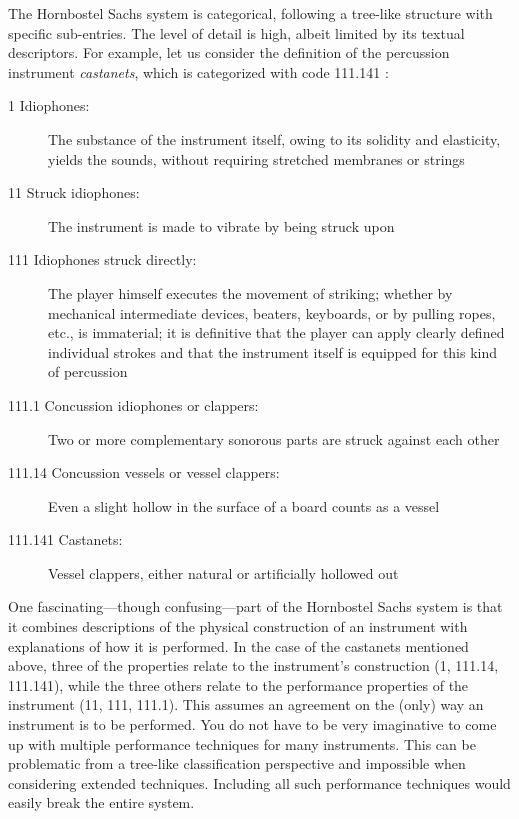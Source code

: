 The Hornbostel Sachs system is categorical, following a tree-like structure with specific sub-entries. The level of detail is high, albeit limited by its textual descriptors. For example, let us consider the definition of the percussion instrument \emph{castanets}, which is categorized with code 111.141 \citep[p. 14]{von_hornbostel_classification_1961}:

\begin{description}
  \item[1 Idiophones:] The substance of the instrument itself, owing to its solidity and elasticity, yields the sounds, without requiring stretched membranes or strings

  \item[11 Struck idiophones:] The instrument is made to vibrate by being struck upon

  \item[111 Idiophones struck directly:] The player himself executes the movement of striking; whether by mechanical intermediate devices, beaters, keyboards, or by pulling ropes, etc., is immaterial; it is definitive that the player can apply clearly defined individual strokes and that the instrument itself is equipped for this kind of percussion

  \item[111.1 Concussion idiophones or clappers:] Two or more complementary sonorous parts are struck against each other

  \item[111.14 Concussion vessels or vessel clappers:] Even a slight hollow in the surface of a board counts as a vessel

  \item[111.141 Castanets:] Vessel clappers, either natural or artificially hollowed out
\end{description}

One fascinating---though confusing---part of the Hornbostel Sachs system is that it combines descriptions of the physical construction of an instrument with explanations of how it is performed. In the case of the castanets mentioned above, three of the properties relate to the instrument's construction (1, 111.14, 111.141), while the three others relate to the performance properties of the instrument (11, 111, 111.1). This assumes an agreement on the (only) way an instrument is to be performed. You do not have to be very imaginative to come up with multiple performance techniques for many instruments. This can be problematic from a tree-like classification perspective and impossible when considering extended techniques. Including all such performance techniques would easily break the entire system.

